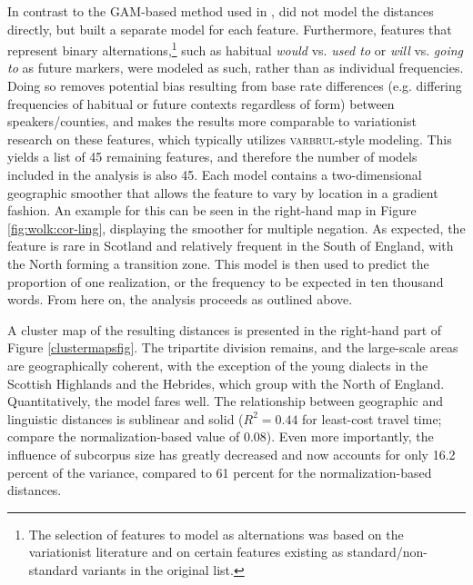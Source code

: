 \documentclass[output=paper]{LSP/langsci}
\begin{document}
In contrast to the GAM-based method used in \citet{wieling_quantitative_2012}, \citet{wolk_integrating_2014} did not model the distances directly, but built a separate model for each feature.
Furthermore, features that represent binary alternations,\footnote{The selection of features to model as alternations was based on the variationist literature and on certain features existing as standard/non-standard variants in the original list.} such as habitual \emph{would} vs. \emph{used to} or \emph{will} vs. \emph{going to} as future markers, were modeled as such, rather than as individual frequencies.
Doing so removes potential bias resulting from base rate differences (e.g. differing frequencies of habitual or future contexts regardless of form) between speakers/counties, and makes the results more comparable to variationist research on these features, which typically utilizes \textsc{varbrul}-style modeling.
This yields a list of 45 remaining features, and therefore the number of models included in the analysis is also 45.
Each model contains a two-dimensional geographic smoother that allows the feature to vary by location in a gradient fashion.
An example for this can be seen in the right-hand map in Figure \ref{fig:wolk:cor-ling}, displaying the smoother for multiple negation.
As expected, the feature is rare in Scotland and relatively frequent in the South of England, with the North forming a transition zone.
This model is then used to predict the proportion of one realization, or the frequency to be expected in ten thousand words.
From here on, the analysis proceeds as outlined above.

A cluster map of the resulting distances is presented in the right-hand part of Figure \ref{clustermapsfig}. 
The tripartite division remains, and the large-scale areas are geographically coherent, with the exception of the young dialects in the Scottish Highlands and the Hebrides, which group with the North of England.
Quantitatively, the model fares well. The relationship between geographic and linguistic distances is sublinear and solid ($R^2 = 0.44$ for least-cost travel time; compare the normalization-based value of $0.08$).
Even more importantly, the influence of subcorpus size has greatly decreased and now accounts for only 16.2 percent of the variance, compared to 61 percent for the normalization-based distances.
\end{document}
